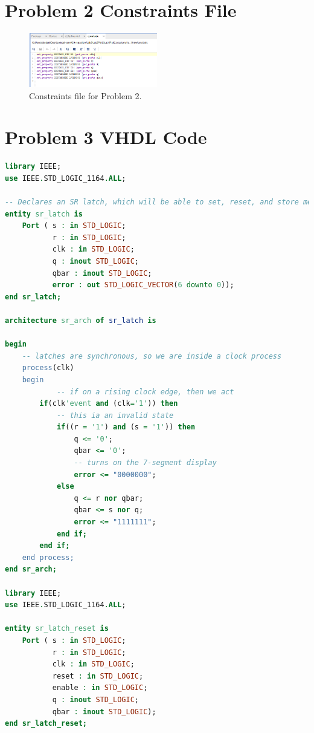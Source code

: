 \documentclass[11pt]{article}
\begin{document}
\begin{appendices}
\section{Problem 2 Constraints File}
\begin{figure}[H]
\begin{center}
	\includegraphics[width=0.5\textwidth]{./images/Lab5Part2Const.png}
	\caption{\label{fig:Part2ConstFile}Constraints file for Problem 2.}
\end{center}
\end{figure}

\section{Problem 3 VHDL Code}
\begin{lstlisting}[language=VHDL]
library IEEE;
use IEEE.STD_LOGIC_1164.ALL;

-- Declares an SR latch, which will be able to set, reset, and store memory
entity sr_latch is
    Port ( s : in STD_LOGIC;
           r : in STD_LOGIC;
           clk : in STD_LOGIC;
           q : inout STD_LOGIC;
           qbar : inout STD_LOGIC;
           error : out STD_LOGIC_VECTOR(6 downto 0));
end sr_latch;

architecture sr_arch of sr_latch is

begin
	-- latches are synchronous, so we are inside a clock process
    process(clk)
    begin
    		-- if on a rising clock edge, then we act
        if(clk'event and (clk='1')) then
        	-- this ia an invalid state
            if((r = '1') and (s = '1')) then
                q <= '0';
                qbar <= '0';
                -- turns on the 7-segment display
                error <= "0000000";
            else
                q <= r nor qbar;
                qbar <= s nor q;
                error <= "1111111";
            end if;
        end if;
    end process;
end sr_arch;

library IEEE;
use IEEE.STD_LOGIC_1164.ALL;

entity sr_latch_reset is
    Port ( s : in STD_LOGIC;
           r : in STD_LOGIC;
           clk : in STD_LOGIC;
           reset : in STD_LOGIC;
           enable : in STD_LOGIC;
           q : inout STD_LOGIC;
           qbar : inout STD_LOGIC);
end sr_latch_reset;


\end{lstlisting}
\end{appendices}
\end{document}
